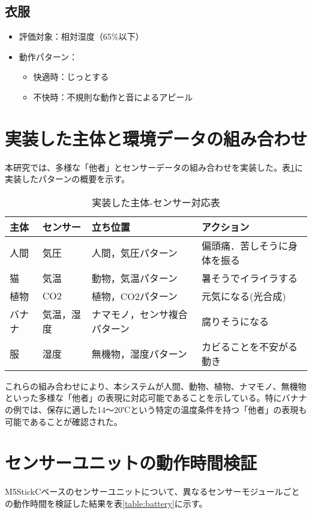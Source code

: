 \documentclass{cuxarticle}
\begin{document}
\subsection{衣服}\cite{--クローゼ}
\begin{itemize}
  \item 評価対象：相対湿度（65\%以下）
  \item 動作パターン：
    \begin{itemize}
      \item 快適時：じっとする
      \item 不快時：不規則な動作と音によるアピール
    \end{itemize}
\end{itemize}

\section{実装した主体と環境データの組み合わせ}
本研究では、多様な「他者」とセンサーデータの組み合わせを実装した。表\ref{table:entities}に実装したパターンの概要を示す。

\begin{table}[htbp]
  \caption{実装した主体-センサー対応表}
  \label{table:entities}
  \centering
  \begin{tabular}{|l|l|l|l|}
    \hline
    主体 & センサー & 立ち位置 & アクション \\
    \hline
    人間 & 気圧 & 人間，気圧パターン & 偏頭痛．苦しそうに身体を振る \\
    \hline
    猫 & 気温 & 動物，気温パターン & 暑そうでイライラする \\
    \hline
    植物 & CO2 & 植物，CO2パターン & 元気になる(光合成) \\
    \hline
    バナナ & 気温，湿度 & ナマモノ，センサ複合パターン & 腐りそうになる \\
    \hline
    服 & 湿度 & 無機物，湿度パターン & カビることを不安がる動き \\
    \hline
  \end{tabular}
\end{table}

これらの組み合わせにより、本システムが人間、動物、植物、ナマモノ、無機物といった多様な「他者」の表現に対応可能であることを示している。特にバナナの例では、保存に適した14～20℃という特定の温度条件を持つ「他者」の表現も可能であることが確認された。

\section{センサーユニットの動作時間検証}
M5StickCベースのセンサーユニットについて、異なるセンサーモジュールごとの動作時間を検証した結果を表\ref{table:battery}に示す。
\end{document}
